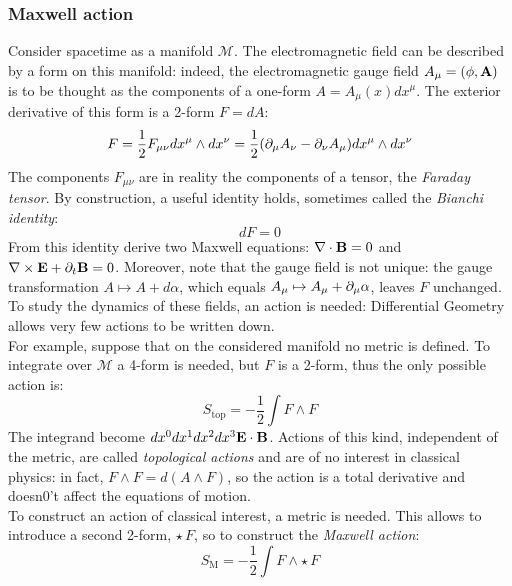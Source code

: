 \subsubsection{Maxwell action}

Consider spacetime as a manifold $ \mathcal{M} $. The electromagnetic field can be described by a form on this manifold: indeed, the electromagnetic gauge field $ A_\mu = (\phi,\mathbf{A}) $ is to be thought as the components of a one-form $ A = A_\mu(x) dx^\mu $. The exterior derivative of this form is a 2-form $ F = dA $:
\begin{equation*}
  F = \frac{1}{2} F_{\mu \nu} dx^\mu \wedge dx^\nu = \frac{1}{2} (\partial_\mu A_\nu - \partial_\nu A_\mu) dx^\mu \wedge dx^\nu
\end{equation*}
The components $ F_{\mu \nu} $ are in reality the components of a tensor, the \textit{Faraday tensor}. By construction, a useful identity holds, sometimes called the \textit{Bianchi identity}:
\begin{equation}
  dF = 0
  \label{eq:3.42}
\end{equation}
From this identity derive two Maxwell equations: $ \nabla\cdot\mathbf{B} = 0 $ and $ \nabla\times\mathbf{E} + \partial_t \mathbf{B} = 0 $. Moreover, note that the gauge field is not unique: the gauge transformation $ A \mapsto A + d\alpha $, which equals $ A_\mu \mapsto A_\mu + \partial_\mu \alpha $, leaves $ F $ unchanged.\\
To study the dynamics of these fields, an action is needed: Differential Geometry allows very few actions to be written down.\\
For example, suppose that on the considered manifold no metric is defined. To integrate over $ \mathcal{M} $ a 4-form is needed, but $ F $ is a 2-form, thus the only possible action is:
\begin{equation}
  S_{\text{top}} = - \frac{1}{2} \int F \wedge F
  \label{eq:3.43}
\end{equation}
The integrand become $ dx^0 dx^1 dx^2 dx^3 \mathbf{E}\cdot\mathbf{B} $. Actions of this kind, independent of the metric, are called \textit{topological actions} and are of no interest in classical physics: in fact, $ F \wedge F = d (A \wedge F) $, so the action is a total derivative and doesn0't affect the equations of motion.\\
To construct an action of classical interest, a metric is needed. This allows to introduce a second 2-form, $ \star\, F $, so to construct the \textit{Maxwell action}:
\begin{equation}
  S_{\text{M}} = - \frac{1}{2} \int F \wedge \star\, F
  \label{eq:3.44}
\end{equation}
